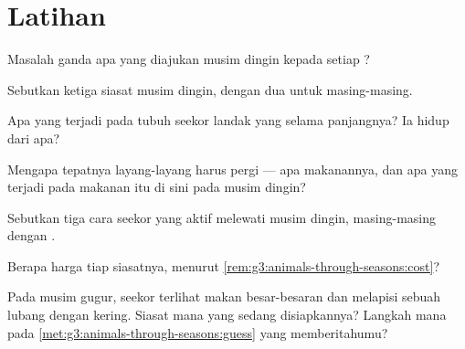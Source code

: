 \section{Latihan}

\begin{exercise}[$\star$]\label{exo:g3:animals-through-seasons:1}
Masalah ganda apa yang diajukan musim dingin kepada setiap ?
\end{exercise}

\begin{exercise}[$\star$]\label{exo:g3:animals-through-seasons:2}
Sebutkan ketiga siasat musim dingin, dengan dua  untuk masing-masing.
\end{exercise}

\begin{exercise}[$\star$]\label{exo:g3:animals-through-seasons:3}
Apa yang terjadi pada tubuh seekor landak yang  selama
 panjangnya? Ia hidup dari apa?
\end{exercise}

\begin{exercise}[$\star$]\label{exo:g3:animals-through-seasons:4}
Mengapa tepatnya  layang-layang harus pergi --- apa makanannya,
dan apa yang terjadi pada makanan itu di sini pada musim dingin?
\end{exercise}

\begin{exercise}[$\star$]\label{exo:g3:animals-through-seasons:5}
Sebutkan tiga cara seekor  yang aktif melewati musim dingin,
masing-masing dengan .
\end{exercise}

\begin{exercise}[$\star$]\label{exo:g3:animals-through-seasons:6}
Berapa harga tiap siasatnya, menurut
\cref{rem:g3:animals-through-seasons:cost}?
\end{exercise}

\begin{exercise}[$\star$]\label{exo:g3:animals-through-seasons:7}
Pada musim gugur, seekor  terlihat makan besar-besaran dan
melapisi sebuah lubang dengan  kering. Siasat mana yang sedang
disiapkannya? Langkah mana pada
\cref{met:g3:animals-through-seasons:guess} yang memberitahumu?
\end{exercise}

